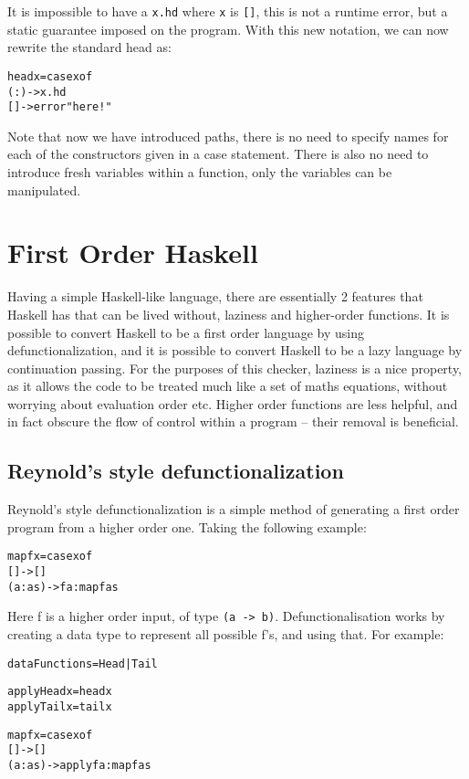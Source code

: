 \documentclass[preprint]{sigplanconf}
\newcommand{\T}[1]{\texttt{#1}}
\newenvironment{code}{\begin{alltt}\small}{\end{alltt}}
\begin{document}
It is impossible to have a \T{x.hd} where \T{x} is \T{[]}, this is not a
runtime error, but a static guarantee imposed on the program. With this new
notation, we can now rewrite the standard head as:

\begin{code}
 head x = case x of
            (:) -> x.hd
            [] -> error "here!"
\end{code}

Note that now we have introduced paths, there is no need to specify names for
each of the constructors given in a case statement. There is also no need to
introduce fresh variables within a function, only the variables can be
manipulated.

\section{First Order Haskell}
\label{chap:defunc}

Having a simple Haskell-like language, there are essentially 2 features that
Haskell has that can be lived without, laziness and higher-order functions. It
is possible to convert Haskell to be a first order language by using
defunctionalization, and it is possible to convert Haskell to be a lazy
language by continuation passing. For the purposes of this checker, laziness is
a nice property, as it allows the code to be treated much like a set of maths
equations, without worrying about evaluation order etc. Higher order functions
are less helpful, and in fact obscure the flow of control within a program --
their removal is beneficial.

\subsection{Reynold's style defunctionalization}

Reynold's style defunctionalization is a simple method of generating a first
order program from a higher order one. Taking the following example:

\begin{code}
 map f x = case x of
                [] -> []
                (a:as) -> f a : map f as
\end{code}

Here f is a higher order input, of type \T{(a -> b)}. Defunctionalisation works
by creating a data type to represent all possible f's, and using that. For
example:

\begin{code}
 data Functions = Head | Tail

 apply Head x = head x
 apply Tail x = tail x

 map f x = case x of
     [] -> []
     (a:as) -> apply f a : map f as
\end{code}
\end{document}
